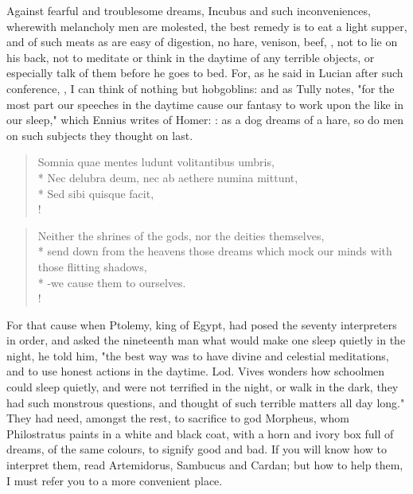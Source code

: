 {Against fearful and troublesome dreams, Incubus and such inconveniences, wherewith melancholy men are molested, the best remedy is to eat a light supper, and of such meats as are easy of digestion, no hare, venison, beef, \etc{}, not to lie on his back, not to meditate or think in the daytime of any terrible objects, or especially talk of them before he goes to bed. For, as he said in Lucian after such conference, , I can think of nothing but hobgoblins: and as Tully notes, "for the most part our speeches in the daytime cause our fantasy to work upon the like in our sleep," which Ennius writes of Homer: : as a dog dreams of a hare, so do men on such subjects they thought on last.

%
\begin{latin}%
\begin{verse}%
Somnia quae mentes ludunt volitantibus umbris,\\*
Nec delubra deum, nec ab aethere numina mittunt,\\*
Sed sibi quisque facit, \etc{}\\!
\end{verse}%
\end{latin}%
\translationrule%
\begin{verse}%
Neither the shrines of the gods, nor the deities themselves,\\*
send down from the heavens those dreams which mock our minds with those flitting shadows,\\*
-we cause them to ourselves.\\!
\end{verse}%

For that cause when Ptolemy, king of Egypt, had posed the seventy interpreters in order, and asked the nineteenth man what would make one sleep quietly in the night, he told him, "the best way was to have divine and celestial meditations, and to use honest actions in the daytime. Lod. Vives wonders how schoolmen could sleep quietly, and were not terrified in the night, or walk in the dark, they had such monstrous questions, and thought of such terrible matters all day long." They had need, amongst the rest, to sacrifice to god Morpheus, whom Philostratus paints in a white and black coat, with a horn and ivory box full of dreams, of the same colours, to signify good and bad. If you will know how to interpret them, read Artemidorus, Sambucus and Cardan; but how to help them, I must refer you to a more convenient place.

}
